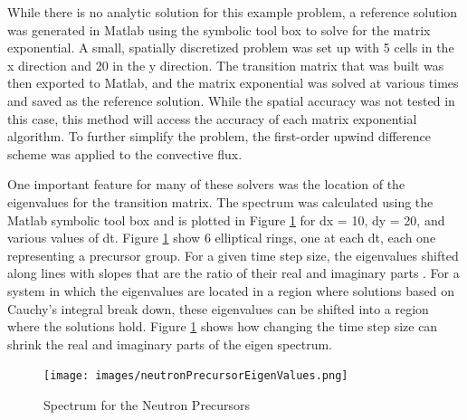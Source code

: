 While there is no analytic solution for this example problem, a reference solution was generated in Matlab using the symbolic tool box to solve for the matrix exponential. A small, spatially discretized problem was set up with 5 cells in the x direction and 20 in the y direction. The transition matrix that was built was then exported to Matlab, and the matrix exponential was solved at various times and saved as the reference solution. While the spatial accuracy was not tested in this case, this method will access the accuracy of each matrix exponential algorithm. To further simplify the problem, the first-order upwind difference scheme was applied to the convective flux.

One important feature for many of these solvers was the location of the eigenvalues for the transition matrix. The spectrum was calculated using the Matlab symbolic tool box and is plotted in Figure \ref{fig:spectrum_neutron_precursors} for dx = 10, dy = 20, and various values of dt. Figure \ref{fig:spectrum_neutron_precursors} show 6 elliptical rings, one at each dt, each one representing a precursor group. For a given time step size, the eigenvalues shifted along lines with slopes that are the ratio of their real and imaginary parts \cite{pusaAccruacy2013}. For a system in which the eigenvalues are located in a region where solutions based on Cauchy's integral break down, these eigenvalues can be shifted into a region where the solutions hold. Figure \ref{fig:spectrum_neutron_precursors} shows how changing the time step size can shrink the real and imaginary parts of the eigen spectrum.

\begin{figure}[htbp]
    \centering
    \texttt{[image: images/neutronPrecursorEigenValues.png]}
    \caption{Spectrum for the Neutron Precursors}
    \label{fig:spectrum_neutron_precursors}
\end{figure}


